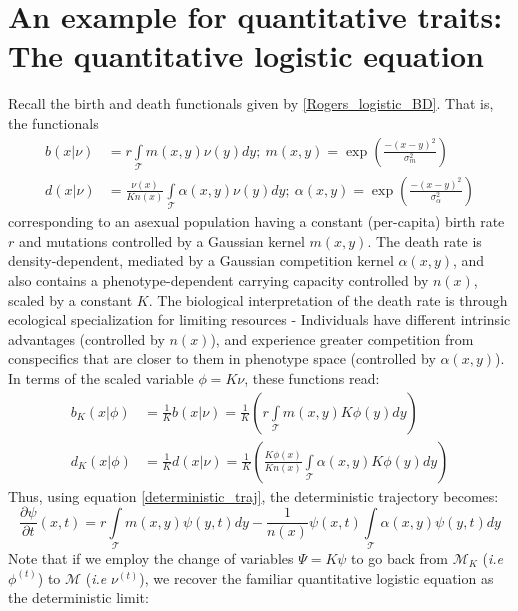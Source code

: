 \section{An example for quantitative traits: The quantitative logistic equation}
Recall the birth and death functionals given by \eqref{Rogers_logistic_BD}. That is, the functionals
\begin{equation}
\begin{aligned}
b(x|\nu) &= r\int\limits_{\mathcal{T}}m(x,y)\nu(y)dy; \ m(x,y) = \exp\left(\frac{-(x-y)^2}{\sigma_{m}^{2}}\right)\\
d(x|\nu) &= \frac{\nu(x)}{Kn(x)}\int\limits_{\mathcal{T}}\alpha(x,y)\nu(y)dy; \ \alpha(x,y) = \exp\left(\frac{-(x-y)^2}{\sigma_{\alpha}^{2}}\right)
\end{aligned}
\end{equation}
corresponding to an asexual population having a constant (per-capita) birth rate $r$ and mutations controlled by a Gaussian kernel $m(x,y)$. The death rate is density-dependent, mediated by a Gaussian competition kernel $\alpha(x,y)$, and also contains a phenotype-dependent carrying capacity controlled by $n(x)$, scaled by a constant $K$. The biological interpretation of the death rate is through ecological specialization for limiting resources - Individuals have different intrinsic advantages (controlled by $n(x)$), and experience greater competition from conspecifics that are closer to them in phenotype space (controlled by $\alpha(x,y)$). In terms of the scaled variable $\phi = K\nu$, these functions read:
\begin{equation}
\label{Rogers_logistic_BD_scaled}
\begin{aligned}
b_K(x|\phi) &= \frac{1}{K}b(x|\nu) = \frac{1}{K}\left( r\int\limits_{\mathcal{T}}m(x,y)K\phi(y)dy\right)\\
    d_K(x|\phi) &= \frac{1}{K}d(x|\nu) =  \frac{1}{K}\left(\frac{K\phi(x)}{Kn(x)}\int\limits_{\mathcal{T}}\alpha(x,y)K\phi(y)dy\right)
\end{aligned}
\end{equation}
Thus, using equation \eqref{deterministic_traj}, the deterministic trajectory becomes:
\begin{equation}
\label{Rogers_logistic_BD_deterministic}
\frac{\partial \psi}{\partial t}(x,t) = r\int\limits_{\mathcal{T}}m(x,y)\psi(y,t)dy-\frac{1}{n(x)}\psi(x,t)\int\limits_{\mathcal{T}}\alpha(x,y)\psi(y,t)dy
\end{equation}
Note that if we employ the change of variables $\Psi = K\psi$ to go back from $\mathcal{M}_{K}$ (\textit{i.e} $\phi^{(t)}$) to $\mathcal{M}$ (\textit{i.e} $\nu^{(t)}$), we recover the familiar quantitative logistic equation as the deterministic limit:
